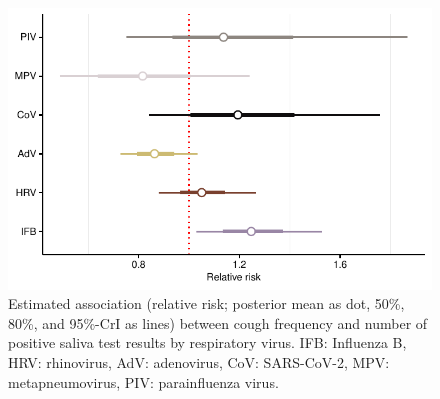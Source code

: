\documentclass[fleqn,11pt]{wlscirep_supp}
\begin{document}
\begin{figure}[!htpb]
    \centering
    \includegraphics{results/cough-data/coughs-virus-association.pdf}
    \caption[Association between cough frequency and virus-specific positivity rate]{Estimated association (relative risk; posterior mean as dot, 50\%, 80\%, and 95\%-CrI as lines) between cough frequency and number of positive saliva test results by respiratory virus. IFB: Influenza B, HRV: rhinovirus, AdV: adenovirus, CoV: SARS-CoV-2, MPV: metapneumovirus, PIV: parainfluenza virus.}
    \label{fig:coughing-association}
\end{figure}

\clearpage


\end{document}
